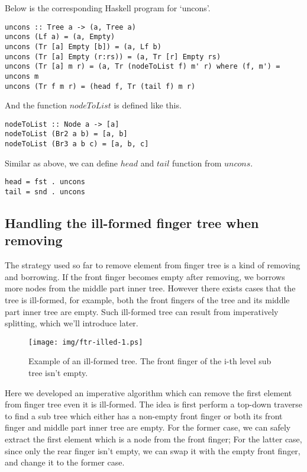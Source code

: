 \documentclass[UTF8]{article}
\begin{document}
Below is the corresponding Haskell program for `uncons'.

\lstset{language=Haskell}
\begin{lstlisting}
uncons :: Tree a -> (a, Tree a)
uncons (Lf a) = (a, Empty)
uncons (Tr [a] Empty [b]) = (a, Lf b)
uncons (Tr [a] Empty (r:rs)) = (a, Tr [r] Empty rs)
uncons (Tr [a] m r) = (a, Tr (nodeToList f) m' r) where (f, m') = uncons m
uncons (Tr f m r) = (head f, Tr (tail f) m r)
\end{lstlisting}

And the function $nodeToList$ is defined like this.

\begin{lstlisting}
nodeToList :: Node a -> [a]
nodeToList (Br2 a b) = [a, b]
nodeToList (Br3 a b c) = [a, b, c]
\end{lstlisting}

Similar as above, we can define $head$ and $tail$ function from
$uncons$.

\begin{lstlisting}
head = fst . uncons
tail = snd . uncons
\end{lstlisting}

\subsection{Handling the ill-formed finger tree when removing}
The strategy used so far to remove element from finger tree is a kind of removing and borrowing.
If the front finger becomes empty after removing, we borrows more nodes from the middle part
inner tree. However there exists cases that the tree is ill-formed, for example, both the
front fingers of the tree and its middle part inner tree are empty. Such ill-formed tree
can result from imperatively splitting, which we'll introduce later.

\begin{figure}[htbp]
  \centering
  \texttt{[image: img/ftr-illed-1.ps]}
  \caption{Example of an ill-formed tree. The front finger of the i-th level sub tree isn't empty.} \label{fig:ftr-illed-form}
\end{figure}

Here we developed an imperative algorithm which can remove the first element from finger tree
even it is ill-formed. The idea is first perform a top-down traverse to find a sub tree which
either has a non-empty front finger or both its front finger and middle part inner tree are empty.
For the former case, we can safely extract the first element which is a node from the front finger;
For the latter case, since only the rear finger isn't empty, we can swap it with the empty front
finger, and change it to the former case.
\end{document}
